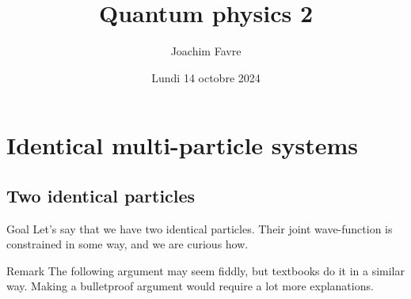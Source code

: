 \documentclass[a4paper]{article}
\title{Quantum physics 2}
\author{Joachim Favre}
\date{Lundi 14 octobre 2024}
\begin{document}
\maketitle


\section{Identical multi-particle systems}

\subsection{Two identical particles}

\begin{parag}{Goal}
    Let's say that we have two identical particles. Their joint wave-function is constrained in some way, and we are curious how.
    
    \begin{subparag}{Remark}
        The following argument may seem fiddly, but textbooks do it in a similar way. Making a bulletproof argument would require a lot more explanations. 
    \end{subparag}
\end{parag}
\end{document}
